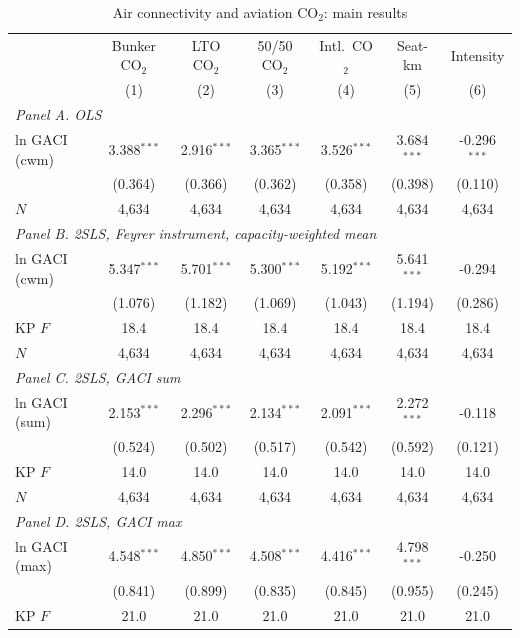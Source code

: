 \begin{table}[htbp]
\centering
\begin{threeparttable}
\caption{Air connectivity and aviation CO$_2$: main results}
\label{tab:main}
\footnotesize
\begin{tabular}{lcccccc}
\toprule
 & \multicolumn{1}{c}{Bunker CO$_2$} & \multicolumn{1}{c}{LTO CO$_2$} & \multicolumn{1}{c}{50/50 CO$_2$} & \multicolumn{1}{c}{Intl.\ CO$_2$} & \multicolumn{1}{c}{Seat-km} & \multicolumn{1}{c}{Intensity} \\
 & (1) & (2) & (3) & (4) & (5) & (6) \\
\midrule
\multicolumn{7}{l}{\textit{Panel A. OLS}} \\
  ln GACI (cwm) & 3.388$^{***}$ & 2.916$^{***}$ & 3.365$^{***}$ & 3.526$^{***}$ & 3.684$^{***}$ & -0.296$^{***}$ \\
   & (0.364) & (0.366) & (0.362) & (0.358) & (0.398) & (0.110) \\
  $N$ & 4,634 & 4,634 & 4,634 & 4,634 & 4,634 & 4,634 \\
\midrule
\multicolumn{7}{l}{\textit{Panel B. 2SLS, Feyrer instrument, capacity-weighted mean}} \\
  ln GACI (cwm) & 5.347$^{***}$ & 5.701$^{***}$ & 5.300$^{***}$ & 5.192$^{***}$ & 5.641$^{***}$ & -0.294 \\
   & (1.076) & (1.182) & (1.069) & (1.043) & (1.194) & (0.286) \\
  KP $F$ & 18.4 & 18.4 & 18.4 & 18.4 & 18.4 & 18.4 \\
  $N$ & 4,634 & 4,634 & 4,634 & 4,634 & 4,634 & 4,634 \\
\midrule
\multicolumn{7}{l}{\textit{Panel C. 2SLS, GACI sum}} \\
  ln GACI (sum) & 2.153$^{***}$ & 2.296$^{***}$ & 2.134$^{***}$ & 2.091$^{***}$ & 2.272$^{***}$ & -0.118 \\
   & (0.524) & (0.502) & (0.517) & (0.542) & (0.592) & (0.121) \\
  KP $F$ & 14.0 & 14.0 & 14.0 & 14.0 & 14.0 & 14.0 \\
  $N$ & 4,634 & 4,634 & 4,634 & 4,634 & 4,634 & 4,634 \\
\midrule
\multicolumn{7}{l}{\textit{Panel D. 2SLS, GACI max}} \\
  ln GACI (max) & 4.548$^{***}$ & 4.850$^{***}$ & 4.508$^{***}$ & 4.416$^{***}$ & 4.798$^{***}$ & -0.250 \\
   & (0.841) & (0.899) & (0.835) & (0.845) & (0.955) & (0.245) \\
  KP $F$ & 21.0 & 21.0 & 21.0 & 21.0 & 21.0 & 21.0 \\

\end{tabular}
\end{threeparttable}
\end{table}
